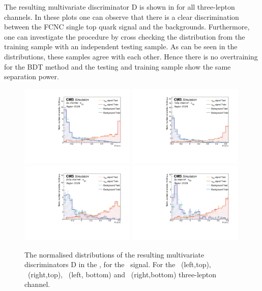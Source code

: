 \clearpage

The resulting multivariate discriminator D is shown in  for all three-lepton channels. In these plots one can observe that there is a clear discrimination between the FCNC single top quark signal and the backgrounds. Furthermore, one can investigate the procedure by cross checking the distribution from the training sample with an independent testing sample. As can be seen in the distributions, these samples agree with each other. Hence there is no overtraining for the BDT method and the testing and training sample show the same separation power. 
\begin{figure}[htbp]
	\centering
	\includegraphics[width=0.49\textwidth]{6_Search/Figures/PlotsTechnics/SigVsBkgTestZutsingletopuuu}
	\includegraphics[width=0.49\textwidth]{6_Search/Figures/PlotsTechnics/SigVsBkgTestZutsingletopuue}
	\includegraphics[width=0.49\textwidth]{6_Search/Figures/PlotsTechnics/SigVsBkgTestZutsingletopeeu}
	\includegraphics[width=0.49\textwidth]{6_Search/Figures/PlotsTechnics/SigVsBkgTestZutsingletopeee}
\caption{The normalised distributions of the resulting  multivariate discriminators D in the \STSR, for the \Zut\ signal. For the \mumumu\ (left,top), \emumu\ (right,top), \eemu\ (left, bottom) and \eee\ (right,bottom) three-lepton channel.}
	\label{fig:sigvsbkgtestzutsingletop}
\end{figure}


